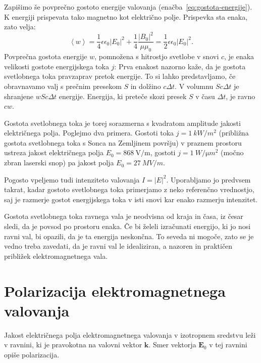 Zapišimo še povprečno gostoto energije valovanja (enačba~\ref{eq:gostota-energije}). 
K energiji prispevata tako magnetno kot električno polje. Prispevka sta enaka, zato velja:
\begin{equation}
\left\langle w\right\rangle =\frac{1}{4}\epsilon\epsilon_{0}\left|E_{0}\right|^{2}+
\frac{1}{4}\frac{\left|B_{0}\right|^{2}}{\mu\mu_{0}}=\frac{1}{2}\epsilon\epsilon_{0}\left|E_{0}\right|^{2}\!\!.
\end{equation}
Povprečna gostota energije $w$, pomnožena s hitrostjo svetlobe v
snovi $c$, je enaka velikosti gostote energijskega toka $j$:
Prva enakost nazorno kaže, da je gostota svetlobnega toka pravzaprav pretok
energije. To si lahko predstavljamo, če obravnavamo valj s prečnim presekom
$S$ in dolžino $c\Delta t$. V volumnu $Sc\Delta t$ je shranjene $wSc\Delta t$
energije. Energija, ki preteče skozi presek $S$ v času $\Delta t$,
je ravno $cw$. 

Gostota svetlobnega toka je torej sorazmerna
s kvadratom amplitude jakosti električnega polja. Poglejmo dva primera.
Gostoti toka $j=1~\si{kW/m^{2}}$
(približna gostota svetlobnega toka s Sonca na Zemljinem površju) v praznem prostoru ustreza 
jakost električnega polja $E_{0}=868~\si{\volt/\meter}$, gostoti $j=1~\si{W/\micro m^{2}}$ 
(močno zbran laserski snop) pa jakost polja $E_{0}=27~\si{MV/m}$. 

Pogosto vpeljemo tudi intenziteto valovanja $I= |E|^2$. Uporabljamo jo 
predvsem takrat, kadar gostoto svetlobnega toka primerjamo z neko referenčno vrednostjo, 
saj je razmerje gostot energijskega toka v isti snovi kar enako razmerju intenzitet.

Gostota svetlobnega toka ravnega vala je neodvisna od kraja in časa, iz česar sledi,
da je povsod po prostoru enaka. Če bi želeli izračunati energijo,
ki jo nosi ravni val, bi opazili, da je ta energija neskončna. To
seveda ni mogoče, zato se je vedno treba zavedati, da je ravni val
le idealiziran, a nazoren in praktičen približek elektromagnetnega
vala.

\section{Polarizacija elektromagnetnega valovanja}
Jakost električnega polja elektromagnetnega valovanja v izotropnem
sredstvu leži v ravnini, ki je pravokotna na valovni vektor $\mathbf{k}$. 
Smer vektorja $\mathbf{E}_0$ v tej ravnini opiše
polarizacija. 

